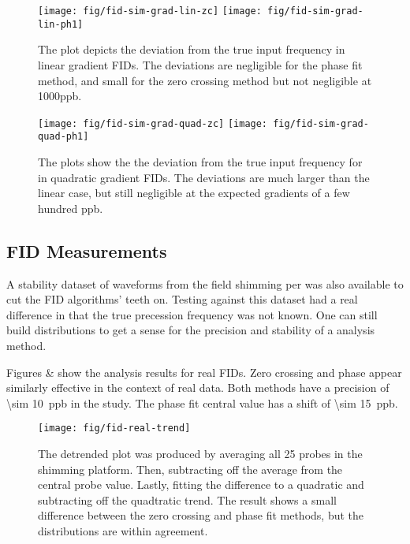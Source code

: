 \begin{figure}
\label{fig:fid-sim-grad-lin-results}
\texttt{[image: fig/fid-sim-grad-lin-zc]}
\texttt{[image: fig/fid-sim-grad-lin-ph1]}
\caption{The plot depicts the deviation from the true input frequency in linear gradient FIDs.  The deviations are negligible for the phase fit method, and small for the zero crossing method but not negligible at 1000ppb.} 
\end{figure}

\begin{figure}
\label{fig:fid-sim-grad-quad-results}
\texttt{[image: fig/fid-sim-grad-quad-zc]}
\texttt{[image: fig/fid-sim-grad-quad-ph1]}
\caption{The plots show the the deviation from the true input frequency for in quadratic gradient FIDs.  The deviations are much larger than the linear case, but still negligible at the expected gradients of a few hundred ppb.}
\end{figure}

\subsection{FID Measurements}
A stability dataset of waveforms from the field shimming per was also available to cut the FID algorithms' teeth on.  Testing against this dataset had a real difference in that the true precession frequency was not known.  One can still build distributions to get a sense for the precision and stability of a analysis method.

Figures \label{fig:fid-real-trend} \& \label{fig:fid-real-freq} show the analysis results for real FIDs.  Zero crossing and phase appear similarly effective in the context of real data.  Both methods have a precision of \SI{\sim 10}{ppb} in the study.  The phase fit central value has a shift of \SI{\sim 15}{ppb}.  

\begin{figure}
\label{fig:fid-real-trend}
\texttt{[image: fig/fid-real-trend]}
\caption{The detrended plot was produced by averaging all 25 probes in the shimming platform.  Then, subtracting off the average from the central probe value.  Lastly, fitting the difference to a quadratic and subtracting off the quadtratic trend.  The result shows a small difference between the zero crossing and phase fit methods, but the distributions are within agreement.}
\end{figure}

